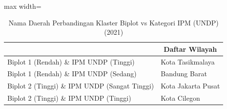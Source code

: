 \begin{table}[H]
\centering
\caption{Nama Daerah Perbandingan Klaster Biplot vs Kategori IPM (UNDP) (2021)} \label{tab:sample1crossname2021}
\begin{adjustbox}{max width=\textwidth}
\begin{tabular}{|>{\centering\arraybackslash}p{4cm}|p{10cm}|}
\hline
\multicolumn{1}{|c|}{\textbf{Kategori}} & \multicolumn{1}{c|}{\textbf{Daftar Wilayah}} \\
\hline
Biplot 1 (Rendah) \& IPM UNDP (Tinggi) & Kota Tasikmalaya \\
\hline
Biplot 1 (Rendah) \& IPM UNDP (Sedang) & Bandung Barat \\
\hline
Biplot 2 (Tinggi) \& IPM UNDP (Sangat Tinggi) & Kota Jakarta Pusat \\
\hline
Biplot 2 (Tinggi) \& IPM UNDP (Tinggi) & Kota Cilegon \\
\hline
\end{tabular}
\end{adjustbox}
\end{table}